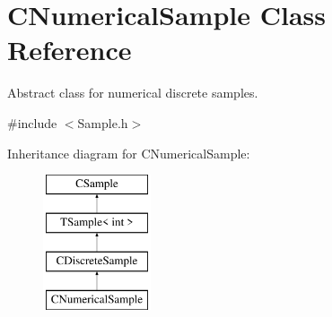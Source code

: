 \hypertarget{class_c_numerical_sample}{\section{C\-Numerical\-Sample Class Reference}
\label{class_c_numerical_sample}
}


Abstract class for numerical discrete samples.  




{\ttfamily \#include $<$Sample.\-h$>$}

Inheritance diagram for C\-Numerical\-Sample\-:\begin{figure}[H]
\begin{center}
\leavevmode
\includegraphics[height=4.000000cm]{class_c_numerical_sample}
\end{center}
\end{figure}
